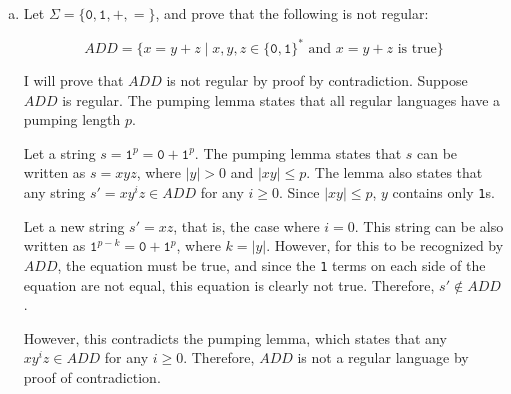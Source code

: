\documentclass{article}
\begin{document}
\begin{enumerate}[(a)]
            \item Let $\Sigma = \{\texttt{0}, \texttt{1}, +, =\}$, and prove that the following is not regular:

                \begin{equation*}
                    ADD = \{x = y + z \mid x, y, z \in \{\texttt{0}, \texttt{1}\}^* \text{ and } x = y + z \text{ is true}\}
                \end{equation*}

                I will prove that $ADD$ is not regular by proof by contradiction. Suppose $ADD$ is regular. The pumping lemma states that all regular languages have a pumping length $p$.

                Let a string $s = \texttt{1}^p = \texttt{0} + \texttt{1}^p$. The pumping lemma states that $s$ can be written as $s = xyz$, where $|y| > 0$ and $|xy| \le p$.  The lemma also states that any string $s' = xy^i z \in ADD$ for any $i \ge 0$. Since $|xy| \le p$, $y$ contains only \texttt{1}s.

                Let a new string $s' = xz$, that is, the case where $i = 0$. This string can be also written as $\texttt{1}^{p-k} = \texttt{0} + \texttt{1}^p$, where $k = |y|$. However, for this to be recognized by $ADD$, the equation must be true, and since the \texttt{1} terms on each side of the equation are not equal, this equation is clearly not true. Therefore, $s' \notin ADD$. 

                However, this contradicts the pumping lemma, which states that any $xy^iz \in ADD$ for any $i \ge 0$. Therefore, $ADD$ is not a regular language by proof of contradiction.

        \end{enumerate}
\end{document}
